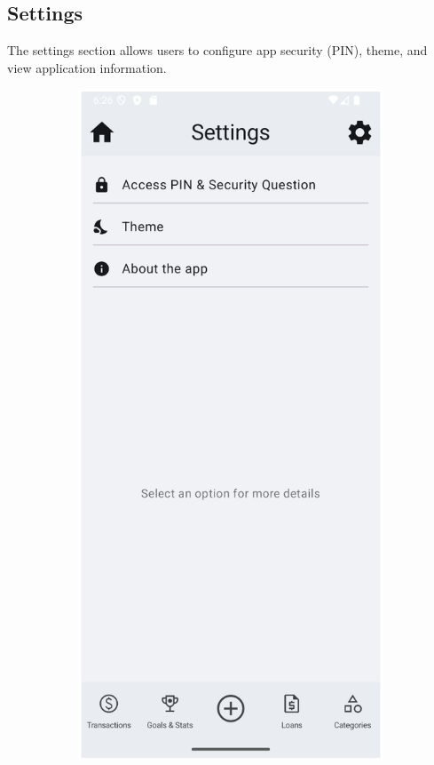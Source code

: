 \documentclass[a4paper,12pt]{article}
\begin{document}
\subsection{Settings}
The settings section allows users to configure app security (PIN), theme, and view application information.

\begin{figure}[H]
    \centering
    \begin{subfigure}[b]{0.23\textwidth}
        \includegraphics[width=\textwidth]{settings.png}

\end{subfigure}
\end{figure}
\end{document}
